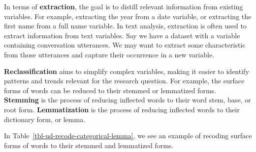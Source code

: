 \documentclass[
  letterpaper,
]{latex/krantz}
\theoremstyle{definition}
\theoremstyle{remark}
\begin{document}
In terms of \textbf{extraction}, the goal is to distill relevant
information from existing variables. For example, extracting the year
from a date variable, or extracting the first name from a full name
variable. In text analysis, extraction is often used to extract
information from text variables. Say we have a dataset with a variable
containing conversation utterances. We may want to extract some
characteristic from those utterances and capture their occurrence in a
new variable.

\textbf{Reclassification} aims to simplify complex variables, making it
easier to identify patterns and trends relevant for the research
question. For example, the surface forms of words can be reduced to
their stemmed or lemmatized forms. \textbf{Stemming} is the process of
reducing inflected words to their word stem, base, or root form.
\textbf{Lemmatization} is the process of reducing inflected words to
their dictionary form, or lemma.

In Table~\ref{tbl-ud-recode-categorical-lemma}, we see an example of
recoding surface forms of words to their stemmed and lemmatized forms.
\end{document}
